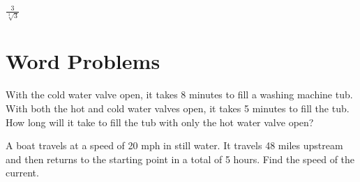 \documentclass[fleqn,addpoints]{exam}
\begin{document}
\begin{questions}
\question \( \displaystyle \frac{3}{\sqrt[3]{3}} \)
\label{radical:last}
\vspace{0.5 in}

\section{Word Problems}

\question
With the cold water valve open, it takes 8 minutes to fill a washing machine tub.  With both the hot and cold water
valves open, it takes 5 minutes to fill the tub.  How long will it take to fill the tub with only the hot water valve
open? 

\vspace{2 in}

\question
A boat travels at a speed of 20 mph in still water.  It travels 48 miles upstream and then returns to the starting point
in a total of 5 hours.  Find the speed of the current.

\vspace{1 in}

\end{questions}
\end{document}
